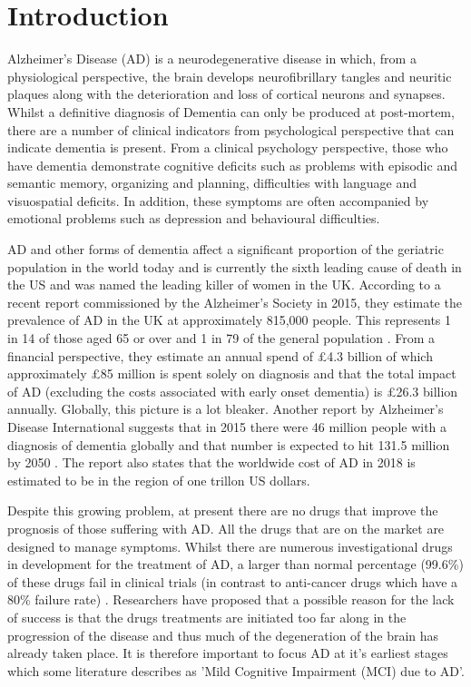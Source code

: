 \documentclass[10pt, letterpaper, twoside, openany]{book}
\begin{document}
\section{Introduction}
Alzheimer's Disease (AD) is a neurodegenerative disease in which, from a physiological perspective, the brain develops neurofibrillary tangles and neuritic plaques along with the deterioration and loss of cortical neurons and synapses. Whilst a definitive diagnosis of Dementia can only be produced at post-mortem, there are a number of clinical indicators from psychological perspective that can indicate dementia is present. From a clinical psychology perspective, those who have dementia demonstrate cognitive deficits such as problems with episodic and semantic memory, organizing and planning, difficulties with language and visuospatial deficits\cite{McKhann2011}. In addition, these symptoms are often accompanied by emotional problems such as depression and behavioural difficulties. 
\par
AD and other forms of dementia affect a significant proportion of the geriatric population in the world today and is currently the sixth leading cause of death in the US and was named the leading killer of women in the UK. According to a recent report commissioned by the Alzheimer's Society in 2015, they estimate the prevalence of AD in the UK at approximately 815,000 people. This represents 1 in 14 of those aged 65 or over and 1 in 79 of the general population \cite{AlzheimersSociety2014}. From a financial perspective, they estimate an annual spend of £4.3 billion of which approximately £85 million is spent solely on diagnosis and that the total impact of AD (excluding the costs associated with early onset dementia) is £26.3 billion annually. Globally, this picture is a lot bleaker. Another report by Alzheimer's Disease International suggests that in 2015 there were 46 million people with a diagnosis of dementia globally and that number is expected to hit 131.5 million by 2050 \cite{Prince2015}. The report also states that the worldwide cost of AD in 2018 is estimated to be in the region of one trillon US dollars.
\par
Despite this growing problem, at present there are no drugs that improve the prognosis of those suffering with AD. All the drugs that are on the market are designed to manage symptoms. Whilst there are numerous investigational drugs in development for the treatment of AD, a larger than normal percentage (99.6\%) of these drugs fail in clinical trials (in contrast to anti-cancer drugs which have a 80\% failure rate) \cite{AlzheimersSociety2014}. Researchers have proposed that a possible reason for the lack of success is that the drugs treatments are initiated too far along in the progression of the disease and thus much of the degeneration of the brain has already taken place. It is therefore important to focus AD at it's earliest stages which some literature describes as 'Mild Cognitive Impairment (MCI) due to AD'.
\end{document}
